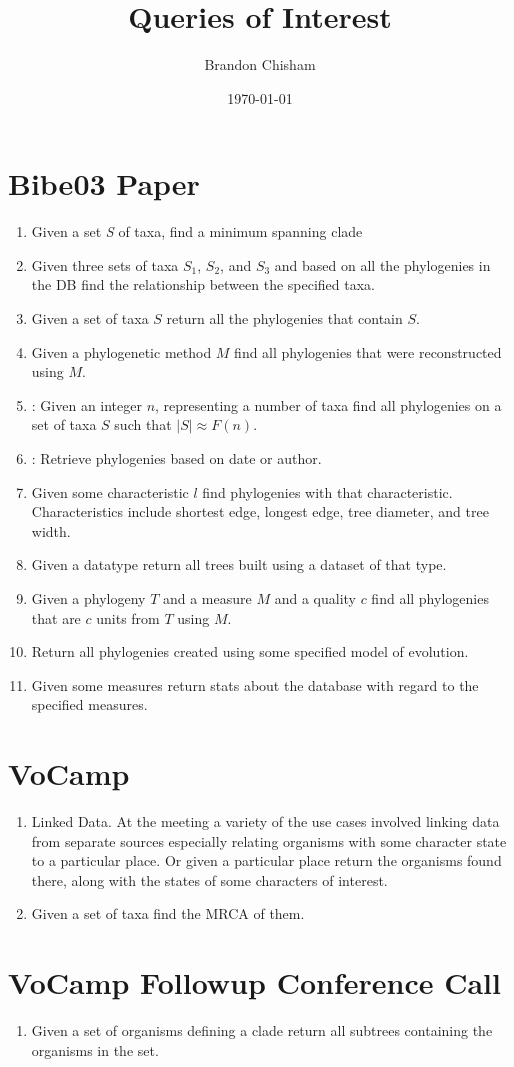 \documentclass[10pt]{article}
\author{Brandon Chisham}
\title{Queries of Interest}
\date{\today}
\newcommand{\BE}{\begin{enumerate}}
\newcommand{\EE}{\end{enumerate}}
\begin{document}
\maketitle

\section{Bibe03 Paper}
 \BE
   \item  Given a set \textit{S} of taxa, find a minimum spanning clade
   \item  Given three sets of taxa $S_1$, $S_2$, and $S_3$  and based
             on all the phylogenies in the DB find the relationship between the
             specified taxa.
   \item  Given a set of taxa $S$ return all the phylogenies that contain $S$.
   \item  Given a phylogenetic method $M$ find all phylogenies that were
             reconstructed using $M$.
   \item: Given an integer $n$, representing a number of taxa find all phylogenies
             on a set of taxa $S$ such that $\vert S \vert \approx F(n).$
   \item: Retrieve phylogenies based on date or author.
   \item  Given some characteristic $l$ find phylogenies with that characteristic.
             Characteristics include shortest edge, longest edge, tree diameter, and tree width.
   \item  Given a datatype return all trees built using a dataset of that type.
   \item  Given a phylogeny $T$ and a measure $M$ and a quality $c$ find all phylogenies that are
             $c$ units from $T$ using $M$.
   \item  Return all phylogenies created using some specified model of evolution.
   \item  Given some measures return stats about the database with regard to the specified measures. 
 \EE

\section{VoCamp}
 \BE
  \item Linked Data. At the meeting a variety of the use cases involved linking data from separate sources 
        especially relating organisms with some character state to a particular place. Or given a particular
        place return the organisms found there, along with the states of some characters of interest.
  \item Given a set of taxa find the MRCA of them.
 \EE

\section{VoCamp Followup Conference Call}
 \BE
  \item Given a set of organisms defining a clade return all subtrees containing the organisms in the set.
 \EE
\end{document}
